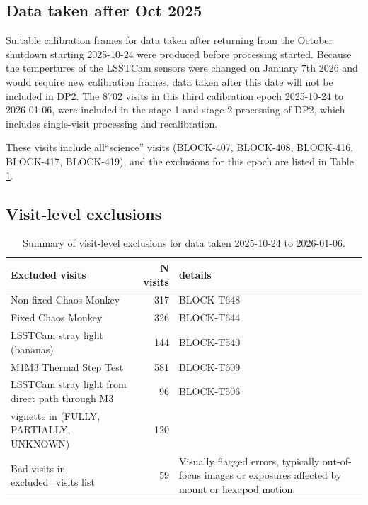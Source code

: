 \subsection{Data taken after Oct 2025}

Suitable calibration frames for data taken after returning from the October shutdown starting 2025-10-24 were produced before processing started.
Because the tempertures of the LSSTCam sensors were changed on January 7th 2026 and would require new calibration frames, data taken after this date will not be included in DP2.
The 8702 visits in this third calibration epoch 2025-10-24 to 2026-01-06, were included in the stage 1 and stage 2 processing of DP2, which includes single-visit processing and recalibration.

These visits include all``science'' visits (BLOCK-407, BLOCK-408, BLOCK-416, BLOCK-417, BLOCK-419), and the exclusions for this epoch are listed in Table \ref{tab:dp2-epoch3-exclusions}.

\subsection{Visit-level exclusions}

\begin{table}
\centering
\caption{Summary of visit-level exclusions for data taken 2025-10-24 to 2026-01-06.}
\label{tab:dp2-epoch3-exclusions}

\begin{tabular}{p{8.5cm} r p{5.5cm}}
\hline
\textbf{Excluded visits} &  \textbf{N visits} & \textbf{details} \\
\hline
Non-fixed Chaos Monkey & 317 & BLOCK-T648  \\
Fixed Chaos Monkey & 326 & BLOCK-T644 \\
LSSTCam stray light (bananas) & 144 & BLOCK-T540  \\
M1M3 Thermal Step Test & 581 & BLOCK-T609  \\
LSSTCam stray light from direct path through M3 & 96 & BLOCK-T506\\
vignette in (FULLY, PARTIALLY, UNKNOWN) & 120 & \\
Bad visits in \href{https://github.com/lsst-dm/excluded_visits/blob/main/LSSTCam/bad.ecsv}{excluded\_visits} list
    & 59 & Visually flagged errors, typically out-of-focus images or exposures affected by mount or hexapod motion.\\

\hline
\end{tabular}
\end{table}

